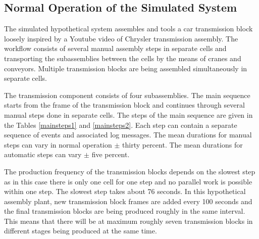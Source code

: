 \documentclass[journal]{IEEEtran}
\begin{document}
\subsection{Normal Operation of the Simulated System}
The simulated hypothetical system assembles and tools a car transmission block loosely inspired by a Youtube video of Chrysler transmission assembly\cite{transmission}.
The workflow consists of several manual assembly steps in separate cells and transporting the subassemblies between the cells by the means of
cranes and conveyors. Multiple transmission blocks are being assembled simultaneously in separate cells.

The transmission component consists of four subassemblies. The main sequence starts from the frame of the transmission block
and continues through several manual steps done in separate cells. The steps of the main sequence are given in
the Tables \ref{mainsteps1} and \ref{mainsteps2}.
Each step can contain a separate sequence of events and associated log messages.
The mean durations for manual steps can vary in normal operation $\pm$ thirty percent. The mean durations for automatic steps can vary
$\pm$ five percent.

The production frequency of the transmission blocks depends on the slowest step as in this case there is only one cell for one step and no
parallel work is possible within one step. The slowest step takes about 76 seconds. In this hypothetical assembly plant, new transmission block
frames are added every 100 seconds and the final transmission blocks are being produced roughly in the same interval. This means that there
will be at maximum roughly seven transmission blocks in different stages being produced at the same time.
\end{document}
